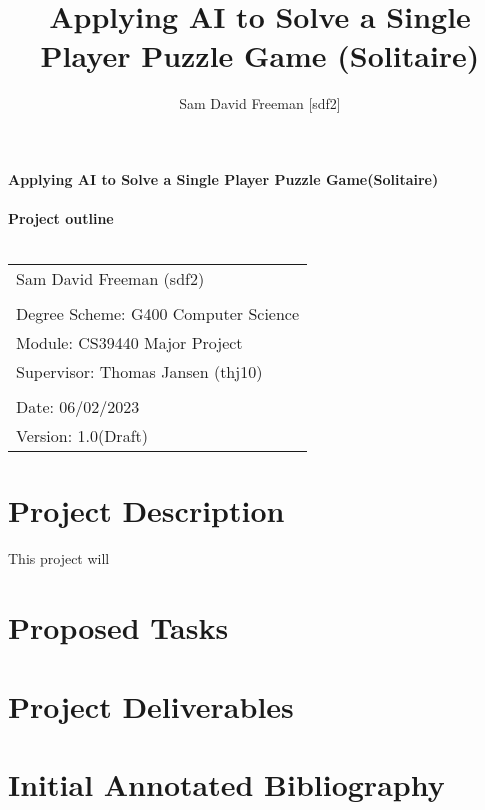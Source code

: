 \documentclass[a4paper,10pt]{article}
\title{Applying AI to Solve a Single Player Puzzle Game (Solitaire)}
\author{Sam David Freeman [sdf2]}
\begin{document}
	\begin{titlepage}
		
		\noindent\LARGE\textbf{Applying AI to Solve a Single Player Puzzle Game(Solitaire)}\\ \\ 
		\Large \textbf{Project outline}\\ \\ 
		\normalsize
		\begin{center}
			\begin{table}[H]
				\begin{tabular}{l}
					Sam David Freeman (sdf2) \\
					\\
					Degree Scheme: G400 Computer Science    \\
					Module: CS39440 Major Project    \\
					Supervisor: Thomas Jansen (thj10)    \\
					                          \\
					Date: 06/02/2023               \\
					Version: 1.0(Draft)              
				\end{tabular}
			\end{table}
		\end{center}

	\end{titlepage}

\newpage
\section*{Project Description}
This project will 
\section*{Proposed Tasks}
\section*{Project Deliverables}
\section*{Initial Annotated Bibliography}
\end{document}
